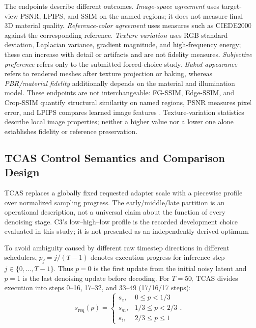 \documentclass[times,twocolumn,final]{elsarticle}
\begin{document}
The endpoints describe different outcomes. \emph{Image-space agreement} uses target-view PSNR, LPIPS, and SSIM on the named regions; it does not measure final 3D material quality. \emph{Reference-color agreement} uses measures such as CIEDE2000 against the corresponding reference. \emph{Texture variation} uses RGB standard deviation, Laplacian variance, gradient magnitude, and high-frequency energy; these can increase with detail or artifacts and are not fidelity measures. \emph{Subjective preference} refers only to the submitted forced-choice study. \emph{Baked appearance} refers to rendered meshes after texture projection or baking, whereas \emph{PBR/material fidelity} additionally depends on the material and illumination model. These endpoints are not interchangeable: FG-SSIM, Edge-SSIM, and Crop-SSIM quantify structural similarity on named regions, PSNR measures pixel error, and LPIPS compares learned image features \cite{wang2004ssim,zhang2018lpips}. Texture-variation statistics describe local image properties; neither a higher value nor a lower one alone establishes fidelity or reference preservation.

\subsection{TCAS Control Semantics and Comparison Design}
\label{subsec:tcas}

TCAS replaces a globally fixed requested adapter scale with a piecewise profile over normalized sampling progress. The early/middle/late partition is an operational description, not a universal claim about the function of every denoising stage. C3's low--high--low profile is the recorded development choice evaluated in this study; it is not presented as an independently derived optimum.

To avoid ambiguity caused by different raw timestep directions in different schedulers, $p_j=j/(T-1)$ denotes execution progress for inference step $j\in\{0,\ldots,T-1\}$. Thus $p=0$ is the first update from the initial noisy latent and $p=1$ is the last denoising update before decoding. For $T=50$, TCAS divides execution into steps 0--16, 17--32, and 33--49 (17/16/17 steps):
\begin{equation}
s_{\mathrm{req}}(p) = \begin{cases} s_e, & 0 \leq p < 1/3 \\ s_m, & 1/3 \leq p < 2/3 \\ s_l, & 2/3 \leq p \leq 1 \end{cases}.
\label{eq:tcas}
\end{equation}
\end{document}
